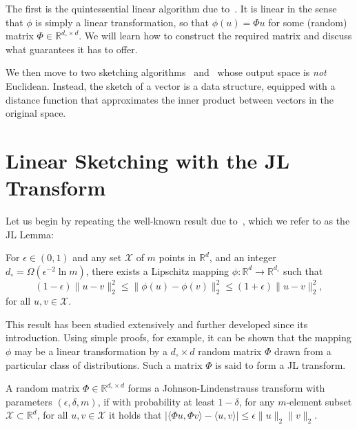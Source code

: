 The first is the quintessential linear algorithm due to~\cite{JLLemma1984ExtensionsOL}.
It is linear in the sense that $\phi$ is simply a linear transformation,
so that $\phi(u) = \Phi u$ for some (random) matrix $\Phi \in \mathbb{R}^{d_\circ \times d}$.
We will learn how to construct the required matrix and discuss what guarantees it has to offer.

We then move to two sketching algorithms~\citep{bruch2023sinnamon} and~\citep{daliri2023sampling} whose
output space is \emph{not} Euclidean. Instead, the sketch of a vector is a data structure,
equipped with a distance function that approximates the inner product
between vectors in the original space.

\section{Linear Sketching with the JL Transform}

Let us begin by repeating the well-known result due to~\cite{JLLemma1984ExtensionsOL},
which we refer to as the JL Lemma:

\begin{lemma}
For $\epsilon \in (0, 1)$ and any set $\mathcal{X}$ of $m$ points
in $\mathbb{R}^d$, and an integer $d_\circ = \Omega(\epsilon^{-2} \ln m)$,
there exists a Lipschitz mapping $\phi: \mathbb{R}^d \rightarrow \mathbb{R}^{d_\circ}$ such that
\begin{equation*}
    (1 - \epsilon) \lVert u - v \rVert_2^2 \leq \lVert \phi(u) - \phi(v) \rVert_2^2
    \leq (1 + \epsilon) \lVert u - v \rVert_2^2,
\end{equation*}
for all $u, v \in \mathcal{X}$.
\end{lemma}

This result has been studied extensively and further developed since its introduction.
Using simple proofs, for example, it can be shown that the mapping $\phi$ may be
a linear transformation by a $d_\circ \times d$ random matrix $\Phi$ drawn
from a particular class of distributions. Such a matrix $\Phi$ is said to form a JL transform.

\begin{definition}
A random matrix $\Phi \in \mathbb{R}^{d_\circ \times d}$ forms a Johnson-Lindenstrauss
transform with parameters $(\epsilon, \delta, m)$, if with probability at least
$1 - \delta$, for any $m$-element subset $\mathcal{X} \subset \mathbb{R}^d$,
for all $u, v \in \mathcal{X}$ it holds that
$|\langle \Phi u, \Phi v \rangle - \langle u, v\rangle | \leq \epsilon \lVert u \rVert_2 \lVert v \rVert_2$.
\end{definition}

